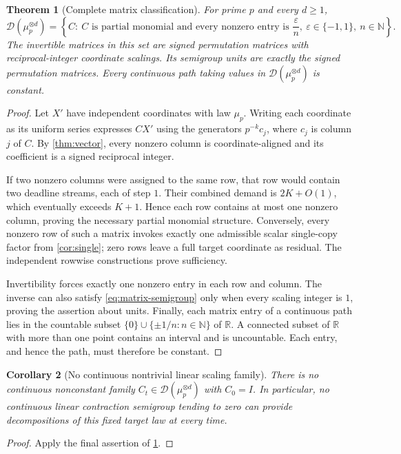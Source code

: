 \documentclass[11pt,a4paper]{article}
\newtheorem{theorem}{Theorem}[section]
\newtheorem{corollary}[theorem]{Corollary}
\theoremstyle{remark}
\newcommand{\R}{\mathbb R}
\newcommand{\N}{\mathbb N}
\begin{document}
\begin{theorem}[Complete matrix classification]
\label{thm:matrix}
For prime $p$ and every $d\ge1$,
\begin{equation}
 \mathcal D(\mu_p^{\otimes d})=
 \left\{C:\ C\text{ is partial monomial and every nonzero entry is }
                    \frac{\varepsilon}{n},\ 
                    \varepsilon\in\{-1,1\},\ n\in\N\right\}.
 \label{eq:matrix-semigroup}
\end{equation}
The invertible matrices in this set are signed permutation matrices with
reciprocal-integer coordinate scalings. Its semigroup units are exactly the
signed permutation matrices. Every continuous path taking values in
$\mathcal D(\mu_p^{\otimes d})$ is constant.
\end{theorem}
\begin{proof}
Let $X'$ have independent coordinates with law $\mu_p$. Writing each coordinate
as its uniform series expresses $CX'$ using the generators $p^{-k}c_j$, where
$c_j$ is column $j$ of $C$. By \cref{thm:vector}, every nonzero column is
coordinate-aligned and its coefficient is a signed reciprocal integer.

If two nonzero columns were assigned to the same row, that row would contain
two deadline streams, each of step $1$. Their combined demand is $2K+O(1)$,
which eventually exceeds $K+1$. Hence each row contains at most one nonzero
column, proving the necessary partial monomial structure. Conversely, every
nonzero row of such a matrix invokes exactly one admissible scalar
single-copy factor from \cref{cor:single}; zero rows leave a full target
coordinate as residual. The independent rowwise constructions prove sufficiency.

Invertibility forces exactly one nonzero entry in each row and column. The
inverse can also satisfy \eqref{eq:matrix-semigroup} only when every scaling
integer is $1$, proving the assertion about units. Finally, each matrix entry
of a continuous path lies in the countable subset
$\{0\}\cup\{\pm1/n:n\in\N\}$ of $\R$. A connected subset of $\R$ with more
than one point contains an interval and is uncountable. Each entry, and hence
the path, must therefore be constant.
\end{proof}

\begin{corollary}[No continuous nontrivial linear scaling family]
There is no continuous nonconstant family $C_t\in\mathcal D(\mu_p^{\otimes d})$
with $C_0=I$. In particular, no continuous linear contraction semigroup tending
to zero can provide decompositions of this fixed target law at every time.
\end{corollary}
\begin{proof}
Apply the final assertion of \cref{thm:matrix}.
\end{proof}
\end{document}
